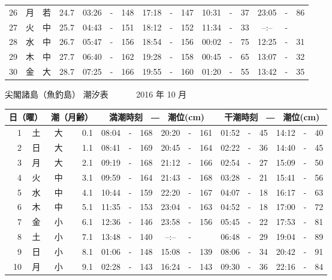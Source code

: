 \documentclass[12pt.a4j]{jsarticle}
\begin{document}
\begin{center}
\begin{table}[ht]
\begin{tabular}{|rc|cr|ccrccr|ccrccr|}
26 & 月 & 若 & 24.7 &  03:26 &-& 148  &  17:18 &-& 147  &   10:31 &-&  37  &   23:05 &-&  86  \\
27 & 火 & 中 & 25.7 &  04:43 &-& 151  &  18:12 &-& 152  &   11:34 &-&  33  &   --:-- &-&     \\
28 & 水 & 中 & 26.7 &  05:47 &-& 156  &  18:54 &-& 156  &   00:02 &-&  75  &   12:25 &-&  31  \\
29 & 木 & 中 & 27.7 &  06:40 &-& 162  &  19:28 &-& 158  &   00:45 &-&  65  &   13:07 &-&  32  \\
30 & 金 & 大 & 28.7 &  07:25 &-& 166  &  19:55 &-& 160  &   01:20 &-&  55  &   13:42 &-&  35  \\
   \hline
   \end{tabular}
\end{table}
\newpage
 {\LARGE 尖閣諸島（魚釣島）  潮汐表　　　}
 {\large 2016 年 10 月}\\
 \begin{table}[ht]
    \begin{tabular}{|rc|cr|ccrccr|ccrccr|}
    \hline
    \multicolumn{2}{|c|}{日（曜）} & \multicolumn{2}{c|}{潮（月齢）} & \multicolumn{6}{c|}{満潮時刻　―　潮位(cm)} & \multicolumn{6}{c|}{干潮時刻　―　潮位(cm)} \\
 \hline
 1 & 土 & 大 &  0.1 &  08:04 &-& 168  &  20:20 &-& 161  &   01:52 &-&  45  &   14:12 &-&  40  \\
 2 & 日 & 大 &  1.1 &  08:41 &-& 169  &  20:45 &-& 164  &   02:22 &-&  36  &   14:40 &-&  45  \\
 3 & 月 & 大 &  2.1 &  09:19 &-& 168  &  21:12 &-& 166  &   02:54 &-&  27  &   15:09 &-&  50  \\
 4 & 火 & 中 &  3.1 &  09:59 &-& 164  &  21:43 &-& 168  &   03:28 &-&  21  &   15:41 &-&  56  \\
 5 & 水 & 中 &  4.1 &  10:44 &-& 159  &  22:20 &-& 167  &   04:07 &-&  18  &   16:17 &-&  63  \\
 6 & 木 & 中 &  5.1 &  11:35 &-& 153  &  23:04 &-& 163  &   04:52 &-&  18  &   17:00 &-&  72  \\
 7 & 金 & 小 &  6.1 &  12:36 &-& 146  &  23:58 &-& 156  &   05:45 &-&  22  &   17:53 &-&  81  \\
 8 & 土 & 小 &  7.1 &  13:48 &-& 140  &  --:-- &-&     &   06:48 &-&  29  &   19:04 &-&  89  \\
 9 & 日 & 小 &  8.1 &  01:06 &-& 148  &  15:08 &-& 139  &   08:06 &-&  34  &   20:42 &-&  91  \\
10 & 月 & 小 &  9.1 &  02:28 &-& 143  &  16:24 &-& 143  &   09:30 &-&  36  &   22:16 &-&  84  \\

\end{tabular}
\end{table}
\end{center}
\end{document}
